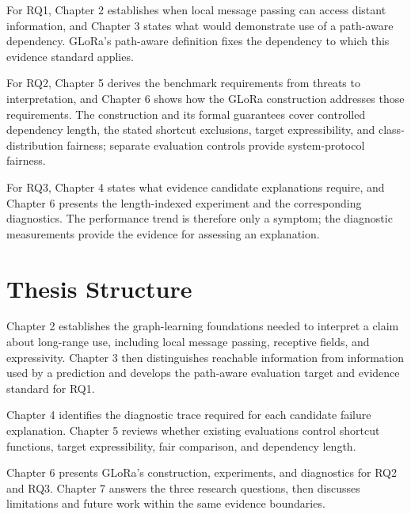 For RQ1, Chapter 2 establishes when local message passing can access distant information, and Chapter 3 states what would demonstrate use of a path-aware dependency.
GLoRa's path-aware definition fixes the dependency to which this evidence standard applies.

For RQ2, Chapter 5 derives the benchmark requirements from threats to interpretation, and Chapter 6 shows how the GLoRa construction addresses those requirements.
The construction and its formal guarantees cover controlled dependency length, the stated shortcut exclusions, target expressibility, and class-distribution fairness; separate evaluation controls provide system-protocol fairness.

For RQ3, Chapter 4 states what evidence candidate explanations require, and Chapter 6 presents the length-indexed experiment and the corresponding diagnostics.
The performance trend is therefore only a symptom; the diagnostic measurements provide the evidence for assessing an explanation.

\section{Thesis Structure}

Chapter 2 establishes the graph-learning foundations needed to interpret a claim about long-range use, including local message passing, receptive fields, and expressivity.
Chapter 3 then distinguishes reachable information from information used by a prediction and develops the path-aware evaluation target and evidence standard for RQ1.

Chapter 4 identifies the diagnostic trace required for each candidate failure explanation.
Chapter 5 reviews whether existing evaluations control shortcut functions, target expressibility, fair comparison, and dependency length.

Chapter 6 presents GLoRa's construction, experiments, and diagnostics for RQ2 and RQ3.
Chapter 7 answers the three research questions, then discusses limitations and future work within the same evidence boundaries.
